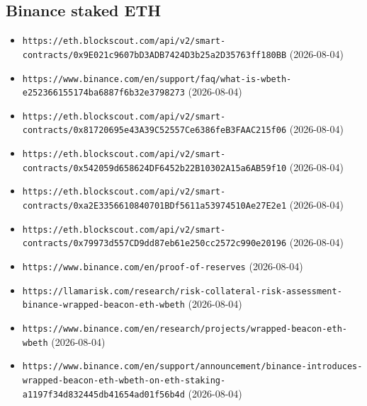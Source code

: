 \subsection*{Binance staked ETH}
\begin{itemize}\setlength{\itemsep}{0pt}\small
\item \texttt{https://eth.blockscout.com/api/v2/smart-contracts/0x9E021c9607bD3ADB7424D3b25a2D35763ff180BB} (2026-08-04)
\item \texttt{https://www.binance.com/en/support/faq/what-is-wbeth-e252366155174ba6887f6b32e3798273} (2026-08-04)
\item \texttt{https://eth.blockscout.com/api/v2/smart-contracts/0x81720695e43A39C52557Ce6386feB3FAAC215f06} (2026-08-04)
\item \texttt{https://eth.blockscout.com/api/v2/smart-contracts/0x542059d658624DF6452b22B10302A15a6AB59f10} (2026-08-04)
\item \texttt{https://eth.blockscout.com/api/v2/smart-contracts/0xa2E3356610840701BDf5611a53974510Ae27E2e1} (2026-08-04)
\item \texttt{https://eth.blockscout.com/api/v2/smart-contracts/0x79973d557CD9dd87eb61e250cc2572c990e20196} (2026-08-04)
\item \texttt{https://www.binance.com/en/proof-of-reserves} (2026-08-04)
\item \texttt{https://llamarisk.com/research/risk-collateral-risk-assessment-binance-wrapped-beacon-eth-wbeth} (2026-08-04)
\item \texttt{https://www.binance.com/en/research/projects/wrapped-beacon-eth-wbeth} (2026-08-04)
\item \texttt{https://www.binance.com/en/support/announcement/binance-introduces-wrapped-beacon-eth-wbeth-on-eth-staking-a1197f34d832445db41654ad01f56b4d} (2026-08-04)
\end{itemize}

